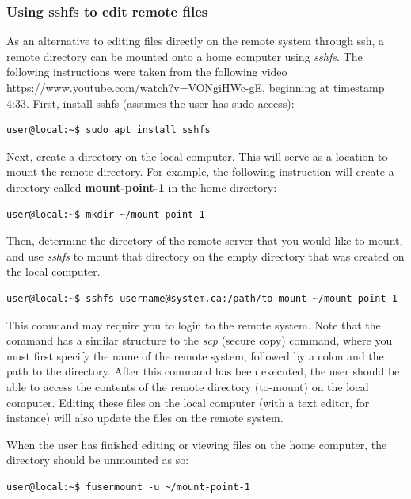 \documentclass[12pt]{article}
\begin{document}
\subsubsection{Using sshfs to edit remote files}\label{sshfs}

\quad As an alternative to editing files directly on the remote system through ssh, a remote directory can be mounted onto a home computer using \textit{sshfs}. The following instructions were taken from the following video \url{https://www.youtube.com/watch?v=VONgiHWc-gE}, beginning at timestamp 4:33. First, install sshfs (assumes the user has sudo access):

\begin{lstlisting}[numbers=none]
user@local:~$ sudo apt install sshfs
\end{lstlisting}

Next, create a directory on the local computer. This will serve as a location to mount the remote directory. For example, the following instruction will create a directory called \textbf{mount-point-1} in the home directory:

\begin{lstlisting}[numbers=none]
user@local:~$ mkdir ~/mount-point-1
\end{lstlisting}

Then, determine the directory of the remote server that you would like to mount, and use \textit{sshfs} to mount that directory on the empty directory that was created on the local computer.

\begin{lstlisting}[numbers=none]
user@local:~$ sshfs username@system.ca:/path/to-mount ~/mount-point-1
\end{lstlisting}

This command may require you to login to the remote system. Note that the command has a similar structure to the \textit{scp} (secure copy) command, where you must first specify the name of the remote system, followed by a colon and the path to the directory. After this command has been executed, the user should be able to access the contents of the remote directory (to-mount) on the local computer. Editing these files on the local computer (with a text editor, for instance) will also update the files on the remote system.

\quad When the user has finished editing or viewing files on the home computer, the directory should be unmounted as so:

\begin{lstlisting}[numbers=none]
user@local:~$ fusermount -u ~/mount-point-1
\end{lstlisting}
\end{document}
